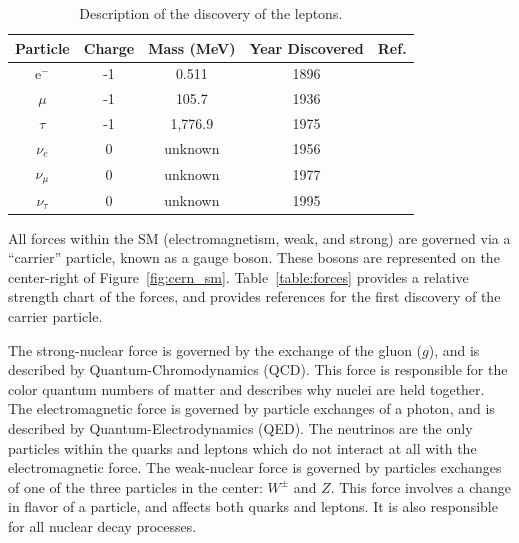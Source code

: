 \begin{table}
\begin{center}
\begin{tabular}{||c c c c c||}
 \hline
 Particle & Charge & Mass (MeV) & Year Discovered & Ref.\\ [0.5ex]
 \hline\hline
 e$^{-}$ & -1 & 0.511 & 1896 & \citep{doi:10.1080/14786449708621070} \\
 \hline
 $\mu$ & -1 & 105.7 & 1936 & \citep{muon_discovery_PhysRev.51.884} \\
 \hline
 $\tau$ & -1 & 1,776.9 & 1975 & \citep{tau_discovery_PhysRevLett.35.1489} \\
 \hline
 $\nu_{e}$ & 0 & unknown & 1956 & \citep{first_neutrino_measurement} \\
 \hline
 $\nu_{\mu}$ & 0 & unknown & 1977 & \citep{PhysRevLett.9.36} \\
 \hline
 $\nu_{\tau}$ & 0 & unknown & 1995 & \citep{tau_neutrino_discovery_KODAMA2001218} \\
 \hline
\end{tabular}
\caption{Description of the discovery of the leptons.
}
\label{table:lepton}
\end{center}
\end{table}

All forces within the SM (electromagnetism, weak, and strong) are governed via a ``carrier'' particle, known as a gauge boson.
These bosons are represented on the center-right of Figure~\ref{fig:cern_sm}.
Table~\ref{table:forces} provides a relative strength chart of the forces, and provides references for the first discovery of the carrier particle.

The strong-nuclear force is governed by the exchange of the gluon ($g$), and is described by Quantum-Chromodynamics (QCD).
This force is responsible for the color quantum numbers of matter and describes why nuclei are held together.
The electromagnetic force is governed by particle exchanges of a photon, and is described by Quantum-Electrodynamics (QED).
The neutrinos are the only particles within the quarks and leptons which do not interact at all with the electromagnetic force.
The weak-nuclear force is governed by particles exchanges of one of the three particles in the center: $W^{\pm}$ and $Z$.
This force involves a change in flavor of a particle, and affects both quarks and leptons.
It is also responsible for all nuclear decay processes.

